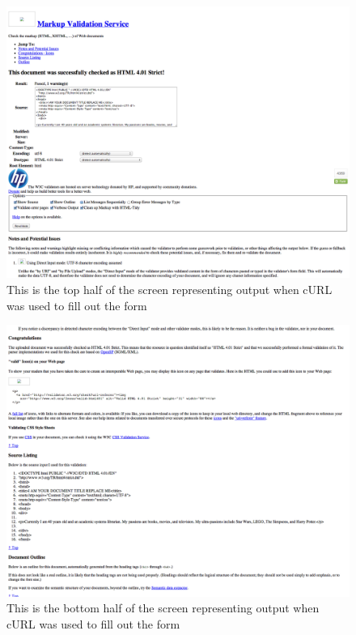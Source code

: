\documentclass{article}
\begin{document}
\begin{figure}
\includegraphics[scale=0.30]{w3cMarkupValidationServiceCurl01}
\caption{This is the top half of the screen representing output when cURL was used to fill out the form}
\end{figure}

\begin{figure}
\includegraphics[scale=0.30]{w3cMarkupValidationServiceCurl02}
\caption{This is the bottom half of the screen representing output when cURL was used to fill out the form}
\end{figure}

\newpage
\end{document}
